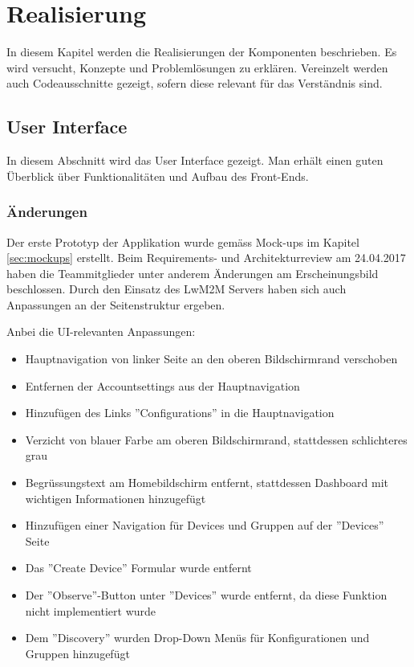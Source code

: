 \chapter{Realisierung}
In diesem Kapitel werden die Realisierungen der Komponenten beschrieben. Es wird versucht, Konzepte und Problemlösungen zu erklären. Vereinzelt werden auch Codeausschnitte gezeigt, sofern diese relevant für das Verständnis sind.

\section{User Interface}
In diesem Abschnitt wird das User Interface gezeigt. Man erhält einen guten Überblick über Funktionalitäten und Aufbau des Front-Ends.

\subsection{Änderungen}
Der erste Prototyp der Applikation wurde gemäss Mock-ups im Kapitel \ref{sec:mockups} erstellt. Beim Requirements- und Architekturreview am 24.04.2017 haben die Teammitglieder unter anderem Änderungen am Erscheinungsbild beschlossen. Durch den Einsatz des LwM2M Servers haben sich auch Anpassungen an der Seitenstruktur ergeben.

Anbei die UI-relevanten Anpassungen:
\begin{itemize}
\item Hauptnavigation von linker Seite an den oberen Bildschirmrand verschoben
\item Entfernen der Accountsettings aus der Hauptnavigation
\item Hinzufügen des Links ''Configurations'' in die Hauptnavigation
\item Verzicht von blauer Farbe am oberen Bildschirmrand, stattdessen schlichteres grau
\item Begrüssungstext am Homebildschirm entfernt, stattdessen Dashboard mit wichtigen Informationen hinzugefügt
\item Hinzufügen einer Navigation für Devices und Gruppen auf der ''Devices'' Seite
\item Das ''Create Device'' Formular wurde entfernt
\item Der ''Observe''-Button unter ''Devices'' wurde entfernt, da diese Funktion nicht implementiert wurde
\item Dem ''Discovery'' wurden Drop-Down Menüs für Konfigurationen und Gruppen hinzugefügt
\end{itemize}

